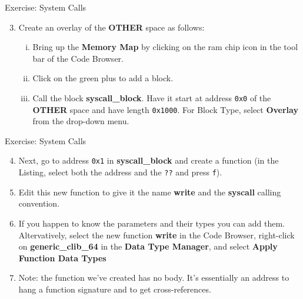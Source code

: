 \documentclass{beamer}
\begin{document}
\begin{frame}
\begin{block}{Exercise: System Calls}
\begin{enumerate}
\setcounter{enumi}{2}
\item Create an overlay of the \textbf{OTHER} space as follows:
\begin{enumerate}[(i)]
\item Bring up the \textbf{Memory Map} by clicking on the ram chip icon in the tool bar of the Code Browser.
\item Click on the green plus to add a block.
\item Call the block \textbf{syscall\_block}.  Have it start at address \texttt{0x0} of the \textbf{OTHER} space and have length \texttt{0x1000}.
For Block Type, select \textbf{Overlay} from the drop-down menu.
\end{enumerate}
\end{enumerate}
\end{block}
\end{frame}

\begin{frame}
\begin{block}{Exercise: System Calls}
\begin{enumerate}
\setcounter{enumi}{3}
\item Next, go to address \texttt{0x1} in \textbf{syscall\_block} and create a function (in the Listing, select both the address and the \texttt{??} and press \texttt{f}).
\item Edit this new function to give it the name \textbf{write} and the \textbf{syscall} calling convention.
\item If you happen to know the parameters and their types you can add them.  Altervatively, select the new function \textbf{write} in the Code Browser, right-click on
\textbf{generic\_clib\_64} in the \textbf{Data Type Manager}, and select \textbf{Apply Function Data Types}
\item[] Note: the function we've created has no body. It's essentially an address to hang a function signature and to get cross-references.
\end{enumerate}
\end{block}
\end{frame}
\end{document}
